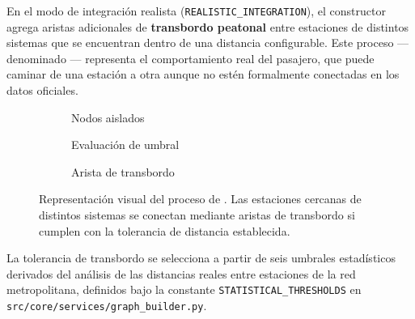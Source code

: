 En el modo de integración realista (\texttt{REALISTIC\_INTEGRATION}), el
constructor agrega aristas adicionales de \textbf{transbordo peatonal} entre
estaciones de distintos sistemas que se encuentran dentro de una distancia
configurable. Este proceso —denominado —
representa el comportamiento real del pasajero, que puede caminar de una
estación a otra aunque no estén formalmente conectadas en los datos oficiales.

\begin{figure}[H]
    \centering
    \begin{subfigure}[b]{0.32\textwidth}
        \centering
        \caption{Nodos aislados}
        \label{fig:snap1}
    \end{subfigure}
    \hfill
    \begin{subfigure}[b]{0.32\textwidth}
        \centering
        \caption{Evaluación de umbral}
        \label{fig:snap2}
    \end{subfigure}
    \hfill
    \begin{subfigure}[b]{0.32\textwidth}
        \centering
        \caption{Arista de transbordo}
        \label{fig:snap3}
    \end{subfigure}
    \caption[Secuencia del Snapping Lógico Geográfico]
    {Representación visual del proceso de . Las estaciones 
    cercanas de distintos sistemas se conectan mediante aristas de transbordo si cumplen con 
    la tolerancia de distancia establecida.}
    \label{fig:proceso-snapping}
\end{figure}

La tolerancia de transbordo se selecciona a partir de seis umbrales estadísticos
derivados del análisis de las distancias reales entre estaciones de la red
metropolitana, definidos bajo la constante \texttt{STATISTICAL\_THRESHOLDS} en
\texttt{src/core/services/graph\_builder.py}.

